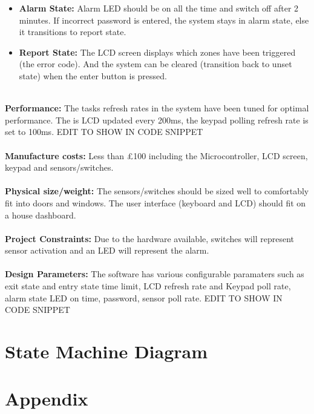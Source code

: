 \documentclass[aps, secnumarabic, balancelastpage, asmath, amssymb, nofootinbib, floatfix,]{revtex4-2}
\begin{document}
{{\begin{itemize}
\item \textbf{Alarm State: }Alarm LED should be on all the time and switch off after 2 minutes. If incorrect password is entered, the system stays in alarm state, else it transitions to report state.
\item \textbf{Report State: }The LCD screen displays which zones have been triggered (the error code). And the system can be cleared (transition back to unset state) when the enter button is pressed.
\end{itemize}
~\\
{\bf Performance: }The tasks refresh rates in the system have been tuned for optimal performance. The is LCD updated every 200ms, the keypad polling refresh rate is set to 100ms. EDIT TO SHOW IN CODE SNIPPET
~\\
~\\
{\bf Manufacture costs: }Less than £100 including the Microcontroller, LCD screen, keypad and sensors/switches.
~\\
~\\
{\bf Physical size/weight: }The sensors/switches should be sized well to comfortably fit into doors and windows. The user interface (keyboard and LCD) should fit on a house dashboard.
~\\
~\\
{\bf Project Constraints: }Due to the hardware available, switches will represent sensor activation and an LED will represent the alarm.
~\\
~\\
{\bf Design Parameters: }The software has various configurable paramaters such as exit state and entry state time limit, LCD refresh rate and Keypad poll rate, alarm state LED on time, password, sensor poll rate. EDIT TO SHOW IN CODE SNIPPET  


}

\clearpage

\section{\fontsize{11.3pt}{12pt}\selectfont \bf State Machine Diagram}
\fontsize{11pt}{12pt}\selectfont
\label{sec:1}


\clearpage

\section{\fontsize{11.3pt}{12pt}\selectfont \bf Appendix}
\fontsize{11pt}{12pt}\selectfont
\label{sec:1}


}
\end{document}
